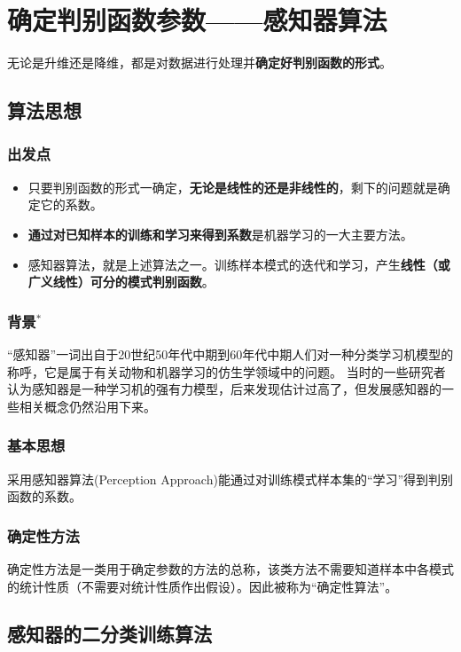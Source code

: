 \documentclass[12pt, letterpaper]{article}
\begin{document}
\section{确定判别函数参数——感知器算法}
无论是升维还是降维，都是对数据进行处理并\textbf{确定好判别函数的形式}。
\subsection{算法思想}
\subsubsection*{出发点}
\begin{itemize}
\item 只要判别函数的形式一确定，\textbf{无论是线性的还是非线性的}，剩下的问题就是确定它的系数。
\item \textbf{通过对已知样本的训练和学习来得到系数}是机器学习的一大主要方法。
\item 感知器算法，就是上述算法之一。训练样本模式的迭代和学习，产生\textbf{线性（或广义线性）可分的模式判别函数}。
\end{itemize}

\subsubsection*{背景$^*$}
“感知器”一词出自于20世纪50年代中期到60年代中期人们对一种分类学习机模型的称呼，它是属于有关动物和机器学习的仿生学领域中的问题。
当时的一些研究者认为感知器是一种学习机的强有力模型，后来发现估计过高了，但发展感知器的一些相关概念仍然沿用下来。


\subsubsection*{基本思想}
采用感知器算法(Perception Approach)能通过对训练模式样本集的“学习”得到判别函数的系数。

\subsubsection*{确定性方法}
确定性方法是一类用于确定参数的方法的总称，该类方法不需要知道样本中各模式的统计性质（不需要对统计性质作出假设）。因此被称为“确定性算法”。

\subsection{感知器的二分类训练算法}
\end{document}
